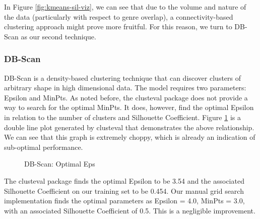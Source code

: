 \documentclass[conference]{IEEEtran}
\begin{document}
In Figure \ref{fig:kmeans-sil-viz}, we can see that due to the volume and nature of the data (particularly with respect to genre overlap), a connectivity-based clustering approach might prove more fruitful. For this reason, we turn to DB-Scan as our second technique. 

\subsubsection{DB-Scan}
DB-Scan is a density-based clustering technique that can discover clusters of arbitrary shape in high dimensional data. The model requires two parameters: Epsilon and MinPts. As noted before, the clusteval package does not provide a way to search for the optimal MinPts. It does, however, find the optimal Epsilon in relation to the number of clusters and Silhouette Coefficient. Figure \ref{fig:dbscan-eps} is a double line plot generated by clusteval that demonstrates the above relationship. We can see that this graph is extremely choppy, which is already an indication of sub-optimal performance. 

 \begin{figure}[!ht]
    \begin{center}
    \end{center}
    \caption{DB-Scan: Optimal Eps}
    \label{fig:dbscan-eps}
\end{figure}


The clusteval package finds the optimal Epsilon to be 3.54 and the associated Silhouette Coefficient on our training set to be 0.454. Our manual grid search implementation finds the optimal parameters as Epsilon = 4.0, MinPts = 3.0, with an associated Silhouette Coefficient of 0.5. This is a negligible improvement. 
\end{document}
